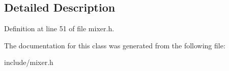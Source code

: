 \subsection{Detailed Description}


Definition at line 51 of file mixer.\-h.



The documentation for this class was generated from the following file\-:\begin{DoxyCompactItemize}
\item 
include/mixer.\-h\end{DoxyCompactItemize}
